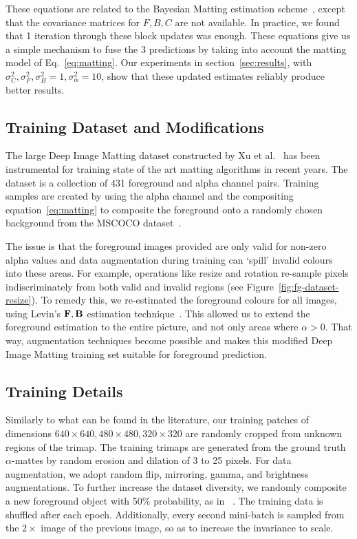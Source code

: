 \documentclass[runningheads]{llncs}
\begin{document}
These equations are related to the Bayesian Matting estimation scheme~\cite{bayesianMatting},
except that the covariance matrices for $F,B,C$ are not available. In practice,
we found that 1 iteration through these block updates was enough. These
equations give us a simple mechanism to fuse the 3 predictions by taking into
account the matting model of Eq.~\ref{eq:matting}. Our experiments in section~\ref{sec:results}, with $\sigma^2_{C},\sigma^2_{F},\sigma^2_{B}=1,\sigma^2_{\alpha}=10$, show
that these updated estimates reliably produce better results.

\subsection{Training Dataset and Modifications}

The large Deep Image Matting dataset constructed by Xu et
al.~\cite{DeepImageMatting} has been instrumental for training state of the art
matting algorithms in recent years. The dataset is a collection of 431
foreground and alpha channel pairs. Training samples are created by using the
alpha channel and the compositing equation~\ref{eq:matting} to composite the foreground
onto a randomly chosen background from the MSCOCO dataset~\cite{mscoco}. 

The issue is that the foreground images provided are only valid for non-zero
alpha values and data augmentation during training can `spill' invalid colours
into these areas. For example, operations like resize and rotation re-sample
pixels indiscriminately from both valid and invalid regions (see
Figure~\ref{fig:fg-dataset-resize}). To remedy this, we re-estimated the foreground colours
for all images, using Levin's $\mathbf{{{F}}},\mathbf{{{B}}}$ estimation
technique~\cite{ClosedFormMattingPAMI}. This allowed us to extend the foreground
estimation to the entire picture, and not only areas where $\alpha>0$. That way,
augmentation techniques become possible and makes this modified Deep Image
Matting training set suitable for foreground prediction.

\subsection{Training Details}

Similarly to what can be found in the literature, our training patches of
dimensions $640\times 640, 480\times 480, 320 \times 320$ are randomly cropped
from unknown regions of the trimap. The training trimaps are generated from the
ground truth $\alpha$-mattes by random erosion and dilation of 3 to 25
pixels. For data augmentation, we adopt random flip, mirroring, gamma, and brightness augmentations. To further increase the dataset
diversity, we randomly composite a new foreground object with 50\% probability, as in ~\cite{LearningBasedSamplingMatting}. The training data is 
shuffled after each epoch. Additionally, every second mini-batch is 
sampled from the $2\times$ image of the previous image, so as to increase the
invariance to scale.
\end{document}

